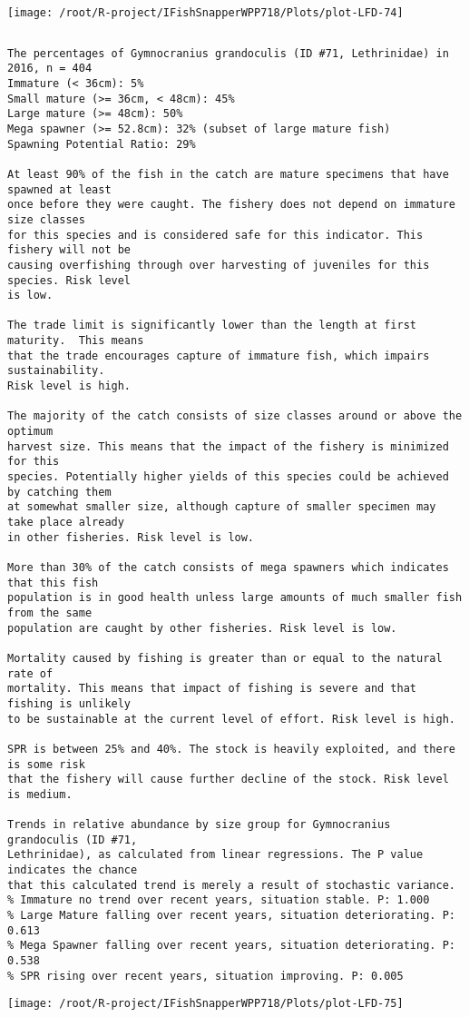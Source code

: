 \documentclass{report}\usepackage[]{graphicx}\usepackage[]{color}
\makeatletter
\def\maxwidth{ %
  \ifdim\Gin@nat@width>\linewidth
    \linewidth
  \else
    \Gin@nat@width
  \fi
}
\newenvironment{kframe}{%
 \def\at@end@of@kframe{}%
 \ifinner\ifhmode%
  \def\at@end@of@kframe{\end{minipage}}%
  \begin{minipage}{\columnwidth}%
 \fi\fi%
 \def\FrameCommand##1{\hskip\@totalleftmargin \hskip-\fboxsep
 \colorbox{shadecolor}{##1}\hskip-\fboxsep
     \hskip-\linewidth \hskip-\@totalleftmargin \hskip\columnwidth}%
 \MakeFramed {\advance\hsize-\width
   \@totalleftmargin\z@ \linewidth\hsize
   \@setminipage}}%
 {\par\unskip\endMakeFramed%
 \at@end@of@kframe}
\newenvironment{knitrout}{}{} %
\makeatother
\begin{document}
\begin{knitrout}
\texttt{[image: /root/R-project/IFishSnapperWPP718/Plots/plot-LFD-74]} 
\begin{kframe}\begin{verbatim}
\end{verbatim}
\end{kframe}
\clearpage
\newpage
\begin{kframe}\begin{verbatim}The percentages of Gymnocranius grandoculis (ID #71, Lethrinidae) in 2016, n = 404
Immature (< 36cm): 5%
Small mature (>= 36cm, < 48cm): 45%
Large mature (>= 48cm): 50%
Mega spawner (>= 52.8cm): 32% (subset of large mature fish)
Spawning Potential Ratio: 29%
 
At least 90% of the fish in the catch are mature specimens that have spawned at least
once before they were caught. The fishery does not depend on immature size classes
for this species and is considered safe for this indicator. This fishery will not be
causing overfishing through over harvesting of juveniles for this species. Risk level
is low.

The trade limit is significantly lower than the length at first maturity.  This means
that the trade encourages capture of immature fish, which impairs sustainability.
Risk level is high.

The majority of the catch consists of size classes around or above the optimum
harvest size. This means that the impact of the fishery is minimized for this
species. Potentially higher yields of this species could be achieved by catching them
at somewhat smaller size, although capture of smaller specimen may take place already
in other fisheries. Risk level is low.

More than 30% of the catch consists of mega spawners which indicates that this fish
population is in good health unless large amounts of much smaller fish from the same
population are caught by other fisheries. Risk level is low.
 
Mortality caused by fishing is greater than or equal to the natural rate of
mortality. This means that impact of fishing is severe and that fishing is unlikely
to be sustainable at the current level of effort. Risk level is high.
 
SPR is between 25% and 40%. The stock is heavily exploited, and there is some risk
that the fishery will cause further decline of the stock. Risk level is medium.
 
Trends in relative abundance by size group for Gymnocranius grandoculis (ID #71,
Lethrinidae), as calculated from linear regressions. The P value indicates the chance
that this calculated trend is merely a result of stochastic variance.
% Immature no trend over recent years, situation stable. P: 1.000
% Large Mature falling over recent years, situation deteriorating. P: 0.613
% Mega Spawner falling over recent years, situation deteriorating. P: 0.538
% SPR rising over recent years, situation improving. P: 0.005
\end{verbatim}
\end{kframe}
\texttt{[image: /root/R-project/IFishSnapperWPP718/Plots/plot-LFD-75]} 


\end{knitrout}
\end{document}
